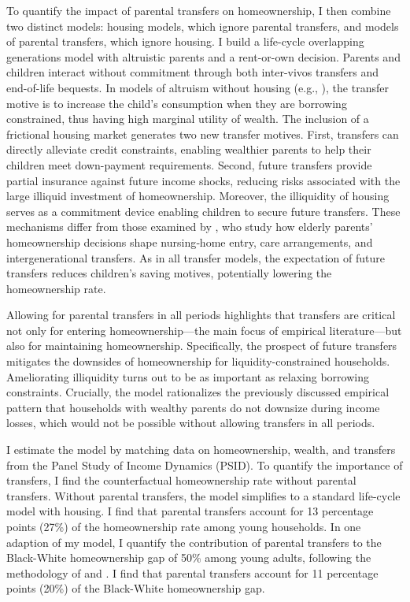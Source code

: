 \documentclass[12pt]{article}
\begin{document}
To quantify the impact of parental transfers on homeownership, I then combine two distinct models: housing models, which ignore parental transfers, and models of parental transfers, which ignore housing. I build a life-cycle overlapping generations model with altruistic parents and a rent-or-own decision. Parents and children interact without commitment through both inter-vivos transfers and end-of-life bequests. In models of altruism without housing (e.g., \citealp{Altonji1997a,Barczyk2014}), the transfer motive is to increase the child's consumption when they are borrowing constrained, thus having high marginal utility of wealth. The inclusion of a frictional housing market generates two new transfer motives. First, transfers can directly alleviate credit constraints, enabling wealthier parents to help their children meet down-payment requirements. Second, future transfers provide partial insurance against future income shocks, reducing risks associated with the large illiquid investment of homeownership. Moreover, the illiquidity of housing serves as a commitment device enabling children to secure future transfers. These mechanisms differ from those examined by \citet{Barczyk2020a}, who study how elderly parents’ homeownership decisions shape nursing‑home entry, care arrangements, and intergenerational transfers. As in all transfer models, the expectation of future transfers reduces children's saving motives, potentially lowering the homeownership rate.

Allowing for parental transfers in all periods highlights that transfers are critical not only for entering homeownership---the main focus of empirical literature---but also for maintaining homeownership. Specifically, the prospect of future transfers mitigates the downsides of homeownership for liquidity-constrained households. Ameliorating illiquidity turns out to be as important as relaxing borrowing constraints. Crucially, the model rationalizes the previously discussed empirical pattern that households with wealthy parents do not downsize during income losses, which would not be possible without allowing transfers in all periods. 

I estimate the model by matching data on homeownership, wealth, and transfers from the Panel Study of Income Dynamics (PSID). To quantify the importance of transfers, I find the counterfactual homeownership rate without parental transfers. Without parental transfers, the model simplifies to a standard life-cycle model with housing. I find that parental transfers account for 13 percentage points (27\%) of the homeownership rate among young households. In one adaption of my model, I quantify the contribution of parental transfers to the Black-White homeownership gap of 50\% among young adults, following the  methodology of \cite{Ashman2020} and \cite{aliprantis2022dynamics}. I find that parental transfers account for 11 percentage points (20\%) of the Black-White homeownership gap. 
\end{document}
